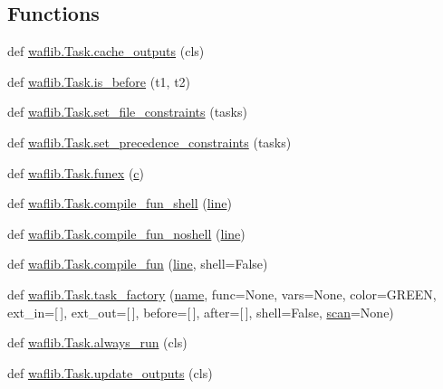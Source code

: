 \subsection*{Functions}
\begin{DoxyCompactItemize}
\item 
def \hyperlink{namespacewaflib_1_1_task_a333db1cc7c2da34b0f075a6806aa4fb0}{waflib.\+Task.\+cache\+\_\+outputs} (cls)
\item 
def \hyperlink{namespacewaflib_1_1_task_a310bd3e0cfd5029a30d31fc0b9d74ebc}{waflib.\+Task.\+is\+\_\+before} (t1, t2)
\item 
def \hyperlink{namespacewaflib_1_1_task_acc993d37750a37787ed0b8f659f1c0bf}{waflib.\+Task.\+set\+\_\+file\+\_\+constraints} (tasks)
\item 
def \hyperlink{namespacewaflib_1_1_task_a0ac0b790b0d39c7a9c17c521b25b8cee}{waflib.\+Task.\+set\+\_\+precedence\+\_\+constraints} (tasks)
\item 
def \hyperlink{namespacewaflib_1_1_task_a0fe5bbefccccafa511b2b51377f60bdc}{waflib.\+Task.\+funex} (\hyperlink{rfft2d_test_m_l_8m_ae0323a9039add2978bf5b49550572c7c}{c})
\item 
def \hyperlink{namespacewaflib_1_1_task_a2c264ecea0ed1b0ef6774cd499f30364}{waflib.\+Task.\+compile\+\_\+fun\+\_\+shell} (\hyperlink{seqread_8c_aad9ebcdde542d8b2075615388ff15a9c}{line})
\item 
def \hyperlink{namespacewaflib_1_1_task_afb4b30ad29fc76227e019d80c31d99ea}{waflib.\+Task.\+compile\+\_\+fun\+\_\+noshell} (\hyperlink{seqread_8c_aad9ebcdde542d8b2075615388ff15a9c}{line})
\item 
def \hyperlink{namespacewaflib_1_1_task_ab362b343e90d74ae2992b6f1e51cf58e}{waflib.\+Task.\+compile\+\_\+fun} (\hyperlink{seqread_8c_aad9ebcdde542d8b2075615388ff15a9c}{line}, shell=False)
\item 
def \hyperlink{namespacewaflib_1_1_task_a781c8ebb9be40227b502fef4a729dd5c}{waflib.\+Task.\+task\+\_\+factory} (\hyperlink{lib_2expat_8h_a1b49b495b59f9e73205b69ad1a2965b0}{name}, func=None, vars=None, color=\textquotesingle{}G\+R\+E\+EN\textquotesingle{}, ext\+\_\+in=\mbox{[}$\,$\mbox{]}, ext\+\_\+out=\mbox{[}$\,$\mbox{]}, before=\mbox{[}$\,$\mbox{]}, after=\mbox{[}$\,$\mbox{]}, shell=False, \hyperlink{seqread_8c_abbf056a5fc06531cfc2da9d8e8330393}{scan}=None)
\item 
def \hyperlink{namespacewaflib_1_1_task_add4cb14fcb77eda6b8ae4f2dd85c068c}{waflib.\+Task.\+always\+\_\+run} (cls)
\item 
def \hyperlink{namespacewaflib_1_1_task_a7530051e65313a94092ad06115c24fd1}{waflib.\+Task.\+update\+\_\+outputs} (cls)
\end{DoxyCompactItemize}
